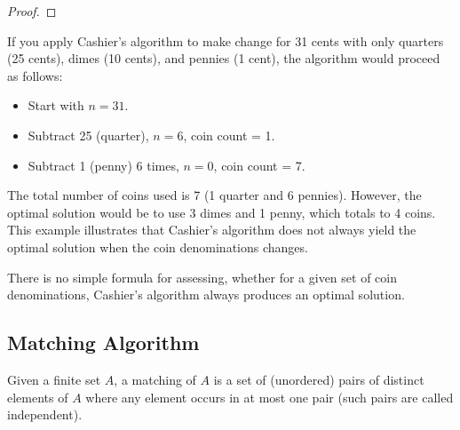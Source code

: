 \begin{proof}
\end{proof}

\begin{eg}
    If you apply Cashier's algorithm to make change for 31 cents with only quarters (25 cents), dimes (10 cents), and pennies (1 cent), the algorithm would proceed as follows:
    \begin{itemize}[itemsep=1pt,label=$\circ$]
        \item Start with $n = 31$.
        \item Subtract 25 (quarter), $n = 6$, coin count = 1.
        \item Subtract 1 (penny) 6 times, $n = 0$, coin count = 7.
    \end{itemize}
    The total number of coins used is 7 (1 quarter and 6 pennies). However, the optimal solution would be to use 3 dimes and 1 penny, which totals to 4 coins. This example illustrates that Cashier's algorithm does not always yield the optimal solution when the coin denominations changes.
\end{eg}
There is no simple formula for assessing, whether for a given set of coin denominations, Cashier's algorithm always produces an optimal solution.

\subsection{Matching Algorithm}
\begin{definition}[Matchings]
    Given a finite set $A$, a matching of $A$ is a set of (unordered) pairs of distinct elements of $A$ where any element occurs in at most one pair (such pairs are called independent).    
\end{definition}

